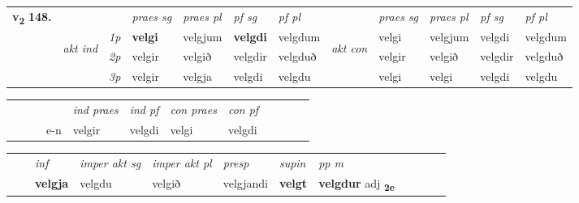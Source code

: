 \begin{tabular}{llllllllllll} \toprule
\multirow{4}{*}{{{\textbf{v{\textsubscript{2}}} \Large{\textbf{148.}}}}}  & &   &  \textit{praes sg}  & \textit{praes pl}  &\textit{ pf sg} & \textit{pf pl} &  &  \textit{praes sg}  & \textit{praes pl}  & \textit{pf sg} & \textit{pf pl } \\*
	\cmidrule{4-7} \cmidrule{9-12}
 & \multirow{3}{*}{\begin{turn}{90}\textit{akt ind}\end{turn}} & {\textit{1p}} & \textbf{velgi} & velgjum    & \textbf{velgdi} & velgdum & \multirow{3}{*}{\begin{turn}{90}\textit{akt con}\end{turn}} &velgi & velgjum & velgdi & velgdum\\*
& &  {\textit{2p}} &  velgir  & velgið   & velgdir & velgduð & & velgir & velgið & velgdir & velgduð \\*
& &  {\textit{3p}} & velgir & velgja   & velgdi & velgdu & & velgi & velgi& velgdi & velgdu  \\*
\cmidrule{4-7} \cmidrule{9-12}
\end{tabular}


\begin{tabular}{llllllllllll}
 & &  & &  \textit{ind praes} & \textit{ind pf} & \textit{con praes} & \textit{con pf} \\*
&  & & e-n & velgir & velgdi & velgi & velgdi \\*
\cmidrule{5-9}
\end{tabular}


\begin{tabular}{llllllllllll}
 & & \textit{inf} & \textit{imper akt sg} & \textit{imper akt pl}   & \textit{presp} & \textit{supin}  & \textit{pp m}     \\*
  & & \textbf{velgja} & velgdu  & velgið   & velgjandi &  \textbf{velgt}  & \textbf{velgdur} adj \textbf{\textsubscript{2e}} \\*
\cmidrule{1-12}
\end{tabular}



